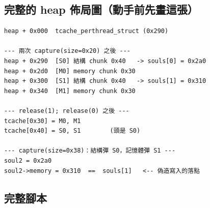 \subsection{完整的 heap 佈局圖（動手前先畫這張）}

\begin{lstlisting}[style=raw]
heap + 0x000  tcache_perthread_struct (0x290)

--- 兩次 capture(size=0x20) 之後 ---
heap + 0x290  [S0] 結構 chunk 0x40   -> souls[0] = 0x2a0
heap + 0x2d0  [M0] memory chunk 0x30
heap + 0x300  [S1] 結構 chunk 0x40   -> souls[1] = 0x310
heap + 0x340  [M1] memory chunk 0x30

--- release(1); release(0) 之後 ---
tcache[0x30] = M0, M1
tcache[0x40] = S0, S1        (頭是 S0)

--- capture(size=0x38)：結構彈 S0，記憶體彈 S1 ---
soul2 = 0x2a0
soul2->memory = 0x310  ==  souls[1]   <-- 偽造寫入的落點
\end{lstlisting}

\subsection{完整腳本}

